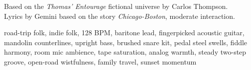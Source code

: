 

\begin{notes}
Based on the \emph{Thomas’ Entourage} fictional universe by Carlos Thompson.\\
Lyrics by Gemini based on the story \emph{Chicago-Boston}, moderate interaction.
\end{notes}

\begin{style}
road-trip folk, indie folk, 128 BPM, baritone lead, fingerpicked acoustic guitar, mandolin counterlines, upright bass, brushed snare kit, pedal steel swells, fiddle harmony, room mic ambience, tape saturation, analog warmth, steady two-step groove, open-road wistfulness, family travel, sunset momentum
\end{style}

